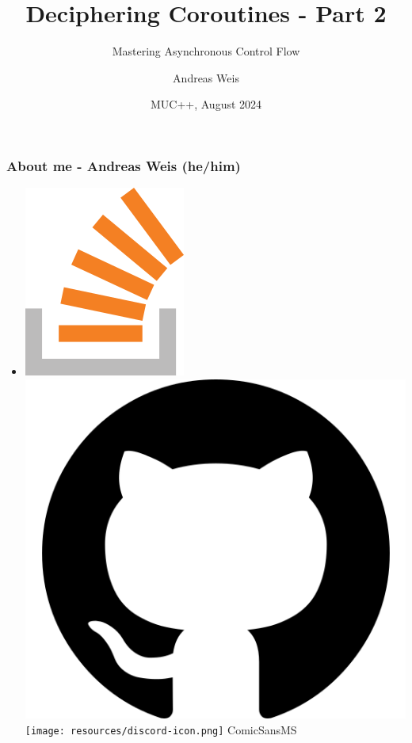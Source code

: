 \documentclass[aspectratio=169]{beamer}
\title{Deciphering Coroutines - Part 2}
\subtitle{Mastering Asynchronous Control Flow}
\author{Andreas Weis}
\date{MUC++, August 2024}
\begin{document}
\frame{\titlepage}

\iftrue %
\fi


\begin{frame}[fragile]
  \frametitle{About me - Andreas Weis (he/him)}

  \begin{itemize}
    \setlength\itemsep{1.5em}

    \item \href{https://stackoverflow.com/users/577603/comicsansms}{\includegraphics[height=.05\textheight]{resources/so-icon.png}} \href{https://github.com/ComicSansMS}{\includegraphics[height=.05\textheight]{resources/github-icon.png}} \texttt{[image: resources/discord-icon.png]} ComicSansMS



\end{itemize}
\end{frame}
\end{document}
